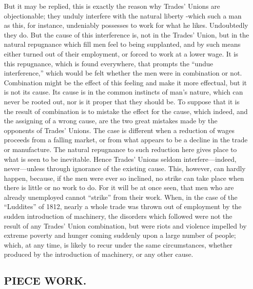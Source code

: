 But it may be replied, this is exactly the reason why Trades' Unions are
objectionable; they unduly interfere with the natural liberty -which
such a man as this, for instance, undeniably possesses to work for what
he likes. Undoubtedly they do. But the cause of this interference is,
not in the Trades' Union, but in the natural repugnance which fill men
feel to being supplanted, and by such means either turned out of their
employment, or forced to work at a lower wage. It is this repugnance,
which is found everywhere, that prompts the ``undue interference,''
which would be felt whether the men were in combination or not.
Combination might be the effect of this feeling and make it more
effectual, but it is not its cause. Its cause is in the common instincts
of man's nature, which can never be rooted out, nor is it proper that
they should be. To suppose that it is the result of combination is to
mistake the effect for the cause, which indeed, and the assigning of a
wrong cause, are the two great mistakes made by the opponents of Trades'
Unions. The case is different when a reduction of wages proceeds from a
falling market, or from what appears to be a decline in the trade or
manufacture. The natural repugnance to such reduction here gives place
to what is seen to be inevitable. Hence Trades' Unions seldom
interfere---indeed, never---unless through ignorance of the existing
cause. This, however, can hardly happen, because, if the men were ever
so inclined, no strike can take place when there is little or no work to
do. For it will be at once seen, that men who are already unemployed
cannot ``strike'' from their work. When, in the case of the ``Luddites''
of 1812, nearly a whole trade was thrown out of employment by the sudden
introduction of machinery, the disorders which followed were not the
result of any Trades' Union combination, but were riots and violence
impelled by extreme poverty and hunger coming suddenly upon a large
number of people; which, at any time, is likely to recur under the same
circumstances, whether produced by the introduction of machinery, or any
other cause.

\subsection{PIECE WORK.}

